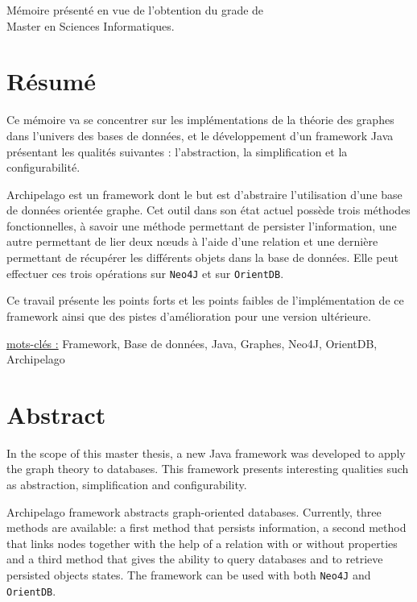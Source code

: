 \documentclass[a4paper,fleqn,12pt,oneside]{report}
\begin{document}
\vspace{0.5cm}
\begin{center}
M\'emoire pr\'esent\'e en vue de l'obtention du grade de\\
Master en Sciences Informatiques.
\end{center}

\section*{Résumé}

Ce mémoire va se concentrer sur les implémentations de la théorie des graphes dans l'univers des bases de données, et le développement d'un framework Java présentant les qualités suivantes : l'abstraction, la simplification et la configurabilité. 

Archipelago est un framework dont le but est d'abstraire l'utilisation d'une base de données orientée graphe. Cet outil dans son  état actuel possède trois méthodes fonctionnelles, à savoir une méthode permettant de persister l'information, une autre permettant de lier deux nœuds à l'aide d'une relation et une dernière permettant de récupérer les différents objets dans la base de données. Elle peut effectuer ces trois opérations sur \texttt{Neo4J} et sur \texttt{OrientDB}.

Ce travail présente les points forts et les points faibles de l'implémentation de ce framework ainsi que des pistes d'amélioration pour une version ultérieure.

\quad \quad \underline{mots-clés :} Framework, Base de données, Java, Graphes, Neo4J, OrientDB, Archipelago
\section*{Abstract}

In the scope of this master thesis, a new Java framework was developed to apply the graph theory to databases. This framework presents interesting qualities such as abstraction, simplification and configurability. 

Archipelago framework abstracts graph-oriented databases. Currently, three methods are available: a first method that persists information, a second method that links nodes together with the help of a relation with or without properties and a third method that gives the ability to query databases and to retrieve persisted objects states. The framework can be used with both \texttt{Neo4J} and \texttt{OrientDB}.
\end{document}
